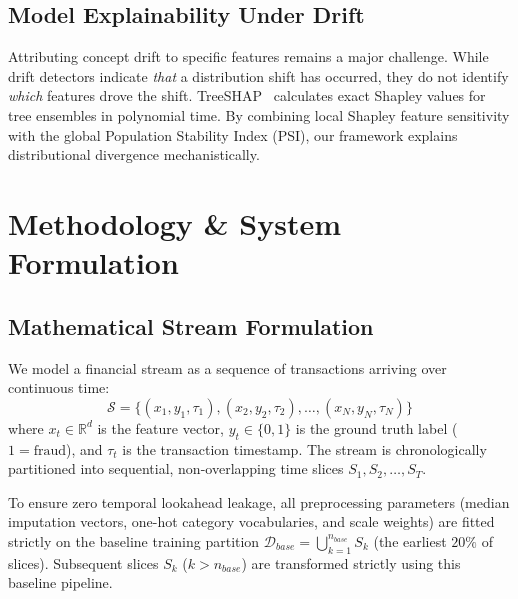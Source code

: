 \documentclass[10pt,conference,compsoc]{IEEEtran}
\begin{document}
\subsection{Model Explainability Under Drift}
Attributing concept drift to specific features remains a major challenge. While drift detectors indicate \textit{that} a distribution shift has occurred, they do not identify \textit{which} features drove the shift. TreeSHAP~\cite{lundberg2020local} calculates exact Shapley values for tree ensembles in polynomial time. By combining local Shapley feature sensitivity with the global Population Stability Index (PSI), our framework explains distributional divergence mechanistically.

\section{Methodology \& System Formulation}
\label{sec:methodology}

\subsection{Mathematical Stream Formulation}
We model a financial stream as a sequence of transactions arriving over continuous time:
\begin{equation}
    \mathcal{S} = \{(x_1, y_1, \tau_1), (x_2, y_2, \tau_2), \dots, (x_N, y_N, \tau_N)\}
\end{equation}
where $x_t \in \mathbb{R}^d$ is the feature vector, $y_t \in \{0, 1\}$ is the ground truth label ($1 = \text{fraud}$), and $\tau_t$ is the transaction timestamp. The stream is chronologically partitioned into sequential, non-overlapping time slices $S_1, S_2, \dots, S_T$. 

To ensure zero temporal lookahead leakage, all preprocessing parameters (median imputation vectors, one-hot category vocabularies, and scale weights) are fitted strictly on the baseline training partition $\mathcal{D}_{base} = \bigcup_{k=1}^{n_{base}} S_k$ (the earliest $20\%$ of slices). Subsequent slices $S_k$ ($k > n_{base}$) are transformed strictly using this baseline pipeline.
\end{document}
